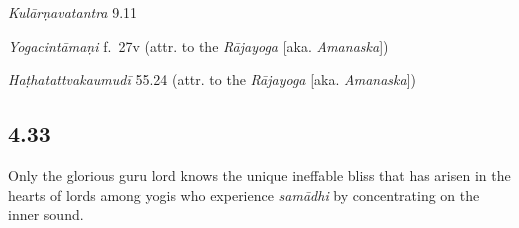 \begin{ekdosis}
\begin{testimonia}[hp04_032_8]
\emph{Kulārṇavatantra} 9.11
\begin{versinnote}
\end{versinnote}

\emph{Yogacintāmaṇi} f.~27v (attr. to the \emph{Rājayoga} [aka. \emph{Amanaska}])
\begin{versinnote}
\end{versinnote}

\emph{Haṭhatattvakaumudī} 55.24 (attr. to the \emph{Rājayoga} [aka. \emph{Amanaska}])
\begin{versinnote}
\end{versinnote}


\end{testimonia}


\subsection*{4.33}
\begin{translation}[hp04_033]
Only the glorious guru lord knows the unique ineffable bliss that has arisen in the hearts of lords among yogis who experience \textit{samādhi} by concentrating on the inner sound.
\end{translation}



\end{ekdosis}
